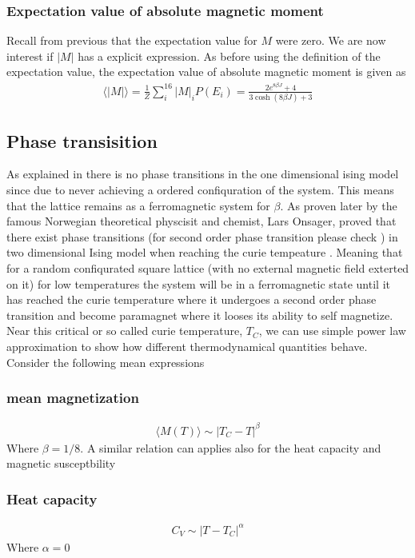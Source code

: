 \documentclass[a4paper, 10pt]{article}
\begin{document}
\subsubsection{Expectation value of absolute magnetic moment} Recall from previous that the expectation value
for $M$ were zero. We are now interest if $|M|$ has a explicit expression. As before using the definition
of the expectation value, the expectation value of absolute magnetic moment is given as
\begin{align}
  \langle |M| \rangle = \frac{1}{Z}\sum_{i}^{16}|M|_{i}P(E_{i}) = \frac{2e^{8\beta J} + 4}{3\cosh{\left(8\beta J\right)} + 3}
\end{align}

\subsection{Phase transisition \label{phase transition}} As explained in \cite{stat} there is no phase transitions in the one dimensional
ising model since due to never achieving a ordered confiquration of the system.
This means that the lattice remains
as a ferromagnetic system for $\beta$. As proven later by the famous Norwegian
theoretical physcisit and chemist, Lars Onsager, proved that there exist
phase transitions (for second order phase transition please check \cite{landau}) in two dimensional Ising model when reaching the curie tempeature \cite{morten}.
 Meaning that for a random confiqurated square lattice
(with no external magnetic field exterted on it)
for low temperatures the system will be in a ferromagnetic state until
it has reached the curie temperature where it undergoes a second order phase transition
and become paramagnet where it looses its ability to self magnetize.
Near this critical or so called curie temperature, $T_{C}$, we can use simple power law approximation to show
how different thermodynamical quantities behave. Consider the following mean expressions
\subsubsection{mean magnetization}
\begin{align}
  \langle M(T) \rangle \sim |T_{C} - T|^{\beta}
\end{align}
Where $\beta = 1/8$. A similar relation can applies also for the heat capacity and magnetic susceptbility
\subsubsection{Heat capacity}
\begin{align}
  C_{V} \sim  |T - T_{C}|^{\alpha}
\end{align}
Where $\alpha = 0$
\end{document}
